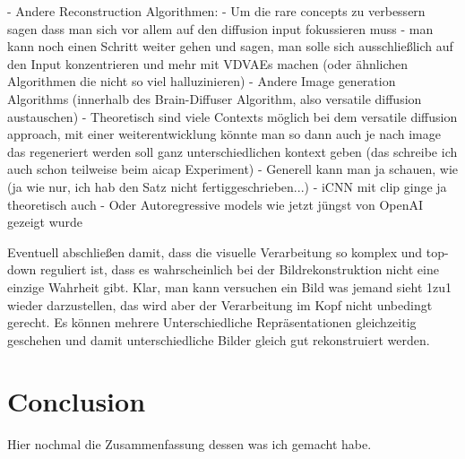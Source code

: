 - Andere Reconstruction Algorithmen:
    - Um die rare concepts zu verbessern sagen \cite{samuelGeneratingImagesRare2024} dass man sich vor allem auf den diffusion input fokussieren muss
        - man kann noch einen Schritt weiter gehen und sagen, man solle sich ausschließlich auf den Input konzentrieren und mehr mit VDVAEs machen (oder ähnlichen Algorithmen die nicht so viel halluzinieren)
    - Andere Image generation Algorithms (innerhalb des Brain-Diffuser Algorithm, also versatile diffusion austauschen)
    - Theoretisch sind viele Contexts möglich bei dem versatile diffusion approach, mit einer weiterentwicklung könnte man so dann auch je nach image das regeneriert werden soll ganz unterschiedlichen kontext geben (das schreibe ich auch schon teilweise beim aicap Experiment)
    - Generell kann man ja schauen, wie (ja wie nur, ich hab den Satz nicht fertiggeschrieben...)
    - iCNN mit clip ginge ja theoretisch auch
    - Oder Autoregressive models wie jetzt jüngst von OpenAI gezeigt wurde


Eventuell abschließen damit, dass die visuelle Verarbeitung so komplex und top-down reguliert ist, dass es wahrscheinlich bei der Bildrekonstruktion nicht eine einzige Wahrheit gibt. Klar, man kann versuchen ein Bild was jemand sieht 1zu1 wieder darzustellen, das wird aber der Verarbeitung im Kopf nicht unbedingt gerecht. Es können mehrere Unterschiedliche Repräsentationen gleichzeitig geschehen und damit unterschiedliche Bilder gleich gut rekonstruiert werden. 


\section{Conclusion}
Hier nochmal die Zusammenfassung dessen was ich gemacht habe. 


